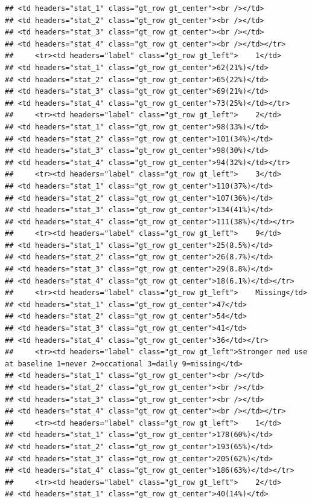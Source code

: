 \documentclass{article}
\begin{document}
\begin{verbatim}
## <td headers="stat_1" class="gt_row gt_center"><br /></td>
## <td headers="stat_2" class="gt_row gt_center"><br /></td>
## <td headers="stat_3" class="gt_row gt_center"><br /></td>
## <td headers="stat_4" class="gt_row gt_center"><br /></td></tr>
##     <tr><td headers="label" class="gt_row gt_left">    1</td>
## <td headers="stat_1" class="gt_row gt_center">62(21%)</td>
## <td headers="stat_2" class="gt_row gt_center">65(22%)</td>
## <td headers="stat_3" class="gt_row gt_center">69(21%)</td>
## <td headers="stat_4" class="gt_row gt_center">73(25%)</td></tr>
##     <tr><td headers="label" class="gt_row gt_left">    2</td>
## <td headers="stat_1" class="gt_row gt_center">98(33%)</td>
## <td headers="stat_2" class="gt_row gt_center">101(34%)</td>
## <td headers="stat_3" class="gt_row gt_center">98(30%)</td>
## <td headers="stat_4" class="gt_row gt_center">94(32%)</td></tr>
##     <tr><td headers="label" class="gt_row gt_left">    3</td>
## <td headers="stat_1" class="gt_row gt_center">110(37%)</td>
## <td headers="stat_2" class="gt_row gt_center">107(36%)</td>
## <td headers="stat_3" class="gt_row gt_center">134(41%)</td>
## <td headers="stat_4" class="gt_row gt_center">111(38%)</td></tr>
##     <tr><td headers="label" class="gt_row gt_left">    9</td>
## <td headers="stat_1" class="gt_row gt_center">25(8.5%)</td>
## <td headers="stat_2" class="gt_row gt_center">26(8.7%)</td>
## <td headers="stat_3" class="gt_row gt_center">29(8.8%)</td>
## <td headers="stat_4" class="gt_row gt_center">18(6.1%)</td></tr>
##     <tr><td headers="label" class="gt_row gt_left">    Missing</td>
## <td headers="stat_1" class="gt_row gt_center">47</td>
## <td headers="stat_2" class="gt_row gt_center">54</td>
## <td headers="stat_3" class="gt_row gt_center">41</td>
## <td headers="stat_4" class="gt_row gt_center">36</td></tr>
##     <tr><td headers="label" class="gt_row gt_left">Stronger med use at baseline 1=never 2=occational 3=daily 9=missing</td>
## <td headers="stat_1" class="gt_row gt_center"><br /></td>
## <td headers="stat_2" class="gt_row gt_center"><br /></td>
## <td headers="stat_3" class="gt_row gt_center"><br /></td>
## <td headers="stat_4" class="gt_row gt_center"><br /></td></tr>
##     <tr><td headers="label" class="gt_row gt_left">    1</td>
## <td headers="stat_1" class="gt_row gt_center">178(60%)</td>
## <td headers="stat_2" class="gt_row gt_center">193(65%)</td>
## <td headers="stat_3" class="gt_row gt_center">205(62%)</td>
## <td headers="stat_4" class="gt_row gt_center">186(63%)</td></tr>
##     <tr><td headers="label" class="gt_row gt_left">    2</td>
## <td headers="stat_1" class="gt_row gt_center">40(14%)</td>

\end{verbatim}
\end{document}
